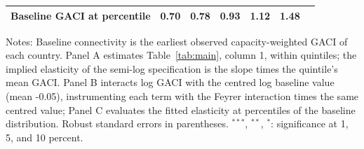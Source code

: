 \documentclass[12pt]{article}
\begin{document}
\begin{table}[htbp]
\begin{threeparttable}
\begin{tabular}{lcccccc}
  Baseline GACI at percentile & 0.70 & 0.78 & 0.93 & 1.12 & 1.48 & \\
\bottomrule
\end{tabular}
\begin{tablenotes}[flushleft]
\footnotesize
\item Notes: Baseline connectivity is the earliest observed capacity-weighted GACI of each country. Panel A estimates Table~\ref{tab:main}, column 1, within quintiles; the implied elasticity of the semi-log specification is the slope times the quintile's mean GACI. Panel B interacts log GACI with the centred log baseline value (mean -0.05), instrumenting each term with the Feyrer interaction times the same centred value; Panel C evaluates the fitted elasticity at percentiles of the baseline distribution. Robust standard errors in parentheses. $^{***}$, $^{**}$, $^{*}$: significance at 1, 5, and 10 percent.
\end{tablenotes}
\end{threeparttable}
\end{table}
\end{document}
